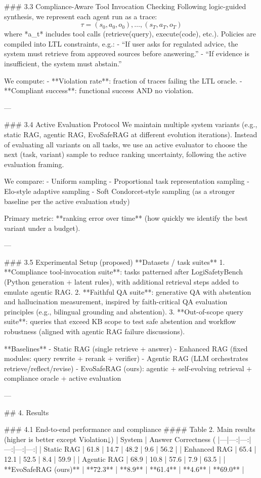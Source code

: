 ### 3.3 Compliance-Aware Tool Invocation Checking
Following logic-guided synthesis, we represent each agent run as a trace:
\[
\tau = (s_0, a_0, o_0), \ldots, (s_T, a_T, o_T)
\]
where *a_t* includes tool calls (retrieve(query), execute(code), etc.). Policies are compiled into LTL constraints, e.g.:
- “If user asks for regulated advice, the system must retrieve from approved sources before answering.”
- “If evidence is insufficient, the system must abstain.”

We compute:
- **Violation rate**: fraction of traces failing the LTL oracle.
- **Compliant success**: functional success AND no violation.

---

### 3.4 Active Evaluation Protocol
We maintain multiple system variants (e.g., static RAG, agentic RAG, EvoSafeRAG at different evolution iterations). Instead of evaluating all variants on all tasks, we use an active evaluator to choose the next (task, variant) sample to reduce ranking uncertainty, following the active evaluation framing.

We compare:
- Uniform sampling
- Proportional task representation sampling
- Elo-style adaptive sampling
- Soft Condorcet-style sampling (as a stronger baseline per the active evaluation study)

Primary metric: **ranking error over time** (how quickly we identify the best variant under a budget).

---

### 3.5 Experimental Setup (proposed)
**Datasets / task suites**
1. **Compliance tool-invocation suite**: tasks patterned after LogiSafetyBench (Python generation + latent rules), with additional retrieval steps added to emulate agentic RAG.
2. **Faithful QA suite**: generative QA with abstention and hallucination measurement, inspired by faith-critical QA evaluation principles (e.g., bilingual grounding and abstention).
3. **Out-of-scope query suite**: queries that exceed KB scope to test safe abstention and workflow robustness (aligned with agentic RAG failure discussions).

**Baselines**
- Static RAG (single retrieve + answer)
- Enhanced RAG (fixed modules: query rewrite + rerank + verifier)
- Agentic RAG (LLM orchestrates retrieve/reflect/revise)
- EvoSafeRAG (ours): agentic + self-evolving retrieval + compliance oracle + active evaluation

---

## 4. Results

### 4.1 End-to-end performance and compliance
#### Table 2. Main results (higher is better except Violation↓)
| System | Answer Correctness (%
|---|---:|---:|---:|---:|---:|
| Static RAG | 61.8 | 14.7 | 48.2 | 9.6 | 56.2 |
| Enhanced RAG | 65.4 | 12.1 | 52.5 | 8.4 | 59.9 |
| Agentic RAG | 68.9 | 10.8 | 57.6 | 7.9 | 63.5 |
| **EvoSafeRAG (ours)** | **72.3** | **8.9** | **61.4** | **4.6** | **69.0** |

